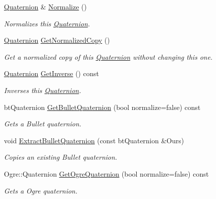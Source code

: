 \begin{DoxyCompactItemize}
\hyperlink{classphys_1_1Quaternion}{Quaternion} \& \hyperlink{classphys_1_1Quaternion_afafa852e782d0fe20d41bc745c8a4734}{Normalize} ()
\begin{DoxyCompactList}\small\item\em Normalizes this \hyperlink{classphys_1_1Quaternion}{Quaternion}. \item\end{DoxyCompactList}\item 
\hyperlink{classphys_1_1Quaternion}{Quaternion} \hyperlink{classphys_1_1Quaternion_a70d6cf4b57f3e74469089747ef755583}{GetNormalizedCopy} ()
\begin{DoxyCompactList}\small\item\em Get a normalized copy of this \hyperlink{classphys_1_1Quaternion}{Quaternion} without changing this one. \item\end{DoxyCompactList}\item 
\hyperlink{classphys_1_1Quaternion}{Quaternion} \hyperlink{classphys_1_1Quaternion_a384833001b14c132553af190e6ebc41e}{GetInverse} () const 
\begin{DoxyCompactList}\small\item\em Inverses this \hyperlink{classphys_1_1Quaternion}{Quaternion}. \item\end{DoxyCompactList}\item 
btQuaternion \hyperlink{classphys_1_1Quaternion_a053f994770b600ae153a142bb4ba7d33}{GetBulletQuaternion} (bool normalize=false) const 
\begin{DoxyCompactList}\small\item\em Gets a Bullet quaternion. \item\end{DoxyCompactList}\item 
void \hyperlink{classphys_1_1Quaternion_a10d3582b2731e70279d7bab43173f317}{ExtractBulletQuaternion} (const btQuaternion \&Ours)
\begin{DoxyCompactList}\small\item\em Copies an existing Bullet quaternion. \item\end{DoxyCompactList}\item 
Ogre::Quaternion \hyperlink{classphys_1_1Quaternion_aa22645e2e2972007bcf61cd2f8e506d0}{GetOgreQuaternion} (bool normalize=false) const 
\begin{DoxyCompactList}\small\item\em Gets a Ogre quaternion. \item\end{DoxyCompactList}\item 

\end{DoxyCompactItemize}
